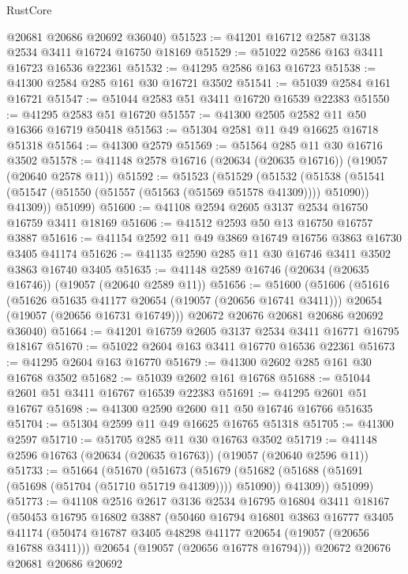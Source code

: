 \begin{lexlean}{RustCore}
\begin{coremodule}
      @20681
      @20686
      @20692
      @36040)
@51523 := @41201 @16712 @2587 @3138 @2534 @3411 @16724 @16750 @18169
@51529 := @51022 @2586 @163 @3411 @16723 @16536 @22361
@51532 := @41295 @2586 @163 @16723
@51538 := @41300 @2584 @285 @161 @30 @16721 @3502
@51541 := @51039 @2584 @161 @16721
@51547 := @51044 @2583 @51 @3411 @16720 @16539 @22383
@51550 := @41295 @2583 @51 @16720
@51557 := @41300 @2505 @2582 @11 @50 @16366 @16719 @50418
@51563 := @51304 @2581 @11 @49 @16625 @16718 @51318
@51564 := @41300 @2579
@51569 := @51564 @285 @11 @30 @16716 @3502
@51578 := @41148 @2578 @16716 (@20634 (@20635 @16716)) (@19057 (@20640 @2578 @11))
@51592 := @51523
    (@51529
      (@51532
        (@51538 (@51541 (@51547 (@51550 (@51557 (@51563 (@51569 @51578 @41309)))) @51090)) @41309))
      @51099)
@51600 := @41108 @2594 @2605 @3137 @2534 @16750 @16759 @3411 @18169
@51606 := @41512 @2593 @50 @13 @16750 @16757 @3887
@51616 := @41154 @2592 @11 @49 @3869 @16749 @16756 @3863 @16730 @3405 @41174
@51626 := @41135 @2590 @285 @11 @30 @16746 @3411 @3502 @3863 @16740 @3405
@51635 := @41148 @2589 @16746 (@20634 (@20635 @16746)) (@19057 (@20640 @2589 @11))
@51656 := @51600
    (@51606
      (@51616
        (@51626 @51635 @41177 @20654 (@19057 (@20656 @16741 @3411)))
        @20654
        (@19057 (@20656 @16731 @16749)))
      @20672
      @20676
      @20681
      @20686
      @20692
      @36040)
@51664 := @41201 @16759 @2605 @3137 @2534 @3411 @16771 @16795 @18167
@51670 := @51022 @2604 @163 @3411 @16770 @16536 @22361
@51673 := @41295 @2604 @163 @16770
@51679 := @41300 @2602 @285 @161 @30 @16768 @3502
@51682 := @51039 @2602 @161 @16768
@51688 := @51044 @2601 @51 @3411 @16767 @16539 @22383
@51691 := @41295 @2601 @51 @16767
@51698 := @41300 @2590 @2600 @11 @50 @16746 @16766 @51635
@51704 := @51304 @2599 @11 @49 @16625 @16765 @51318
@51705 := @41300 @2597
@51710 := @51705 @285 @11 @30 @16763 @3502
@51719 := @41148 @2596 @16763 (@20634 (@20635 @16763)) (@19057 (@20640 @2596 @11))
@51733 := @51664
    (@51670
      (@51673
        (@51679 (@51682 (@51688 (@51691 (@51698 (@51704 (@51710 @51719 @41309)))) @51090)) @41309))
      @51099)
@51773 := @41108
    @2516
    @2617
    @3136
    @2534
    @16795
    @16804
    @3411
    @18167
    (@50453
      @16795
      @16802
      @3887
      (@50460
        @16794
        @16801
        @3863
        @16777
        @3405
        @41174
        (@50474 @16787 @3405 @48298 @41177 @20654 (@19057 (@20656 @16788 @3411)))
        @20654
        (@19057 (@20656 @16778 @16794)))
      @20672
      @20676
      @20681
      @20686
      @20692

\end{coremodule}
\end{lexlean}
